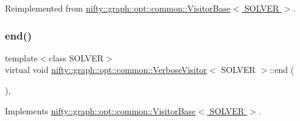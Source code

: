 Reimplemented from \hyperlink{classnifty_1_1graph_1_1opt_1_1common_1_1VisitorBase_a9ac54577b1a0378834ffe2029a321744}{nifty\+::graph\+::opt\+::common\+::\+Visitor\+Base$<$ S\+O\+L\+V\+E\+R $>$}.

\mbox{\label{classnifty_1_1graph_1_1opt_1_1common_1_1VerboseVisitor_ab903991aacf3d9569949c0cce466e3d8}} 
\subsubsection{\texorpdfstring{end()}{end()}}
{\footnotesize\ttfamily template$<$class S\+O\+L\+V\+ER$>$ \\
virtual void \hyperlink{classnifty_1_1graph_1_1opt_1_1common_1_1VerboseVisitor}{nifty\+::graph\+::opt\+::common\+::\+Verbose\+Visitor}$<$ S\+O\+L\+V\+ER $>$\+::end (\begin{DoxyParamCaption}\item[{\hyperlink{classnifty_1_1graph_1_1opt_1_1common_1_1VisitorBase_a433d03139897d4aefe27315b2bbb3adc}{Solver\+Type} $\ast$}]{ }\end{DoxyParamCaption})\hspace{0.3cm}{\ttfamily [inline]}, {\ttfamily [virtual]}}



Implements \hyperlink{classnifty_1_1graph_1_1opt_1_1common_1_1VisitorBase_aab59ead6ecef2fcaf3da5a96d0ec4c51}{nifty\+::graph\+::opt\+::common\+::\+Visitor\+Base$<$ S\+O\+L\+V\+E\+R $>$}.

\mbox{\label{classnifty_1_1graph_1_1opt_1_1common_1_1VerboseVisitor_abfb4175c92ce0c98eb3c214882cde62a}} 
